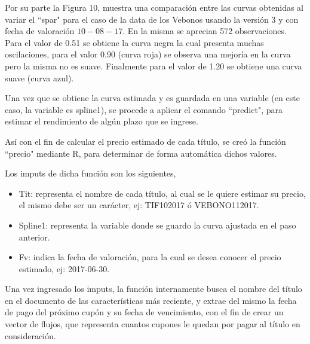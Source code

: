 

\hspace{0.4cm} Por su parte la Figura 10, muestra una comparaci\'on entre las curvas obtenidas al variar el ``spar" para el caso de la data de los Vebonos usando la versi\'on 3 y con fecha de valoraci\'on $10-08-17$. En la misma se aprecian 572 observaciones. Para el valor de 0.51 se obtiene la curva negra la cual presenta muchas oscilaciones, para el valor 0.90 (curva roja) se observa una mejor\'ia en la curva pero la misma no es suave. Finalmente para el valor de 1.20 se obtiene una curva suave (curva azul).


\hspace{0.4cm} Una vez que se obtiene la curva estimada y es guardada en una variable (en este caso, la variable es spline1), se procede a aplicar el comando ``predict", para estimar el rendimiento de alg\'un plazo que se ingrese.

\vspace{0.5cm}


\hspace{0.4cm} As\'i con el fin de calcular el precio estimado de cada t\'itulo, se cre\'o la funci\'on ``precio" mediante R, para determinar de forma autom\'atica dichos valores.

\hspace{0.4cm} Los imputs de dicha funci\'on son los siguientes,


\begin{itemize}
  \item Tit: representa el nombre de cada t\'itulo, al cual se le quiere estimar su precio, el mismo debe ser un car\'acter, ej: TIF102017 \'o VEBONO112017.
  \item Spline1: representa la variable donde se guardo la curva ajustada en el paso anterior.
  \item Fv: indica la fecha de valoraci\'on, para la cual se desea conocer el precio estimado, ej: 2017-06-30.
\end{itemize}


\hspace{0.4cm} Una vez ingresado los imputs, la funci\'on internamente busca el nombre del t\'itulo en el documento de las caracter\'isticas m\'as reciente, y extrae del mismo la fecha de pago del pr\'oximo cup\'on y su fecha de vencimiento, con el fin de crear un vector de flujos, que representa cuantos cupones le quedan por pagar al t\'itulo en consideraci\'on.



